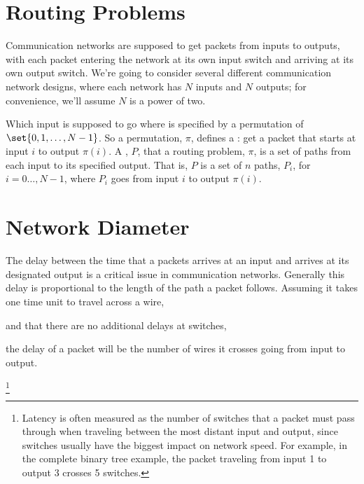 \section{Routing Problems}

Communication networks are supposed to get packets from inputs to outputs,
with each packet entering the network at its own input switch and arriving
at its own output switch.  We're going to consider several different
communication network designs, where each network has $N$ inputs and
$N$ outputs; for convenience, we'll assume $N$ is a power of two.

Which input is supposed to go where is specified by a permutation of
$\set{0, 1, \dots, N - 1}$.  So a permutation, $\pi$, defines a : get a packet that starts at input $i$ to output
$\pi(i)$.  A , $P$, that  a routing problem,
$\pi$, is a set of paths from each input to its specified output.  That
is, $P$ is a set of $n$ paths, $P_i$, for $i=0\dots,N-1$, where $P_i$ goes
from input $i$ to output $\pi(i)$.

\section{Network Diameter}

The delay between the time that a packets arrives at an input and arrives
at its designated output is a critical issue in communication networks.
Generally this delay is proportional to the length of the path a packet
follows.  Assuming it takes one time unit to travel across a wire,
\begin{editingnotes}
and that there are no additional delays at switches,
\end{editingnotes}
the delay of a packet will be the number of wires it crosses going from
input to output.

\begin{editingnotes}

\footnote{Latency is often measured as the number of switches that
a packet must pass through when traveling between the most distant input
and output, since switches usually have the biggest impact on network
speed.  For example, in the complete binary tree example, the packet
traveling from input 1 to output 3 crosses 5 switches.}

\end{editingnotes}

